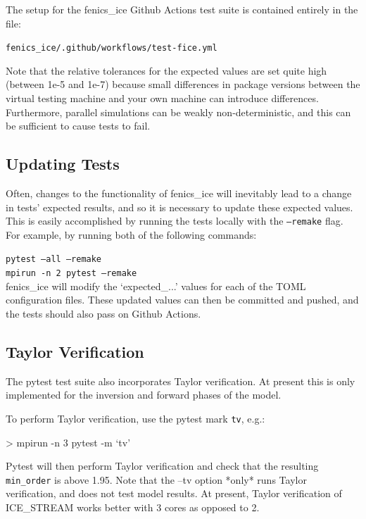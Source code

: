 \documentclass[11pt, reqno, nocenter]{article}
\begin{document}
The setup for the fenics\_ice Github Actions test suite is contained entirely in the file:

\texttt{fenics\_ice/.github/workflows/test-fice.yml}

Note that the relative tolerances for the expected values are set quite high (between 1e-5 and 1e-7) because small differences in package versions between the virtual testing machine and your own machine can introduce differences. Furthermore, parallel simulations can be weakly non-deterministic, and this can be sufficient to cause tests to fail.

\subsection{Updating Tests}

Often, changes to the functionality of fenics\_ice will inevitably lead to a change in tests' expected results, and so it is necessary to update these expected values. This is easily accomplished by running the tests locally with the \texttt{--remake} flag. For example, by running both of the following commands:

\texttt{pytest --all --remake}\\
\texttt{mpirun -n 2 pytest --remake}\\

fenics\_ice will modify the `expected\_...' values for each of the TOML configuration files. These updated values can then be committed and pushed, and the tests should also pass on Github Actions.

\subsection{Taylor Verification}

The pytest test suite also incorporates Taylor verification. At present this is only implemented for the inversion and forward phases of the model.

To perform Taylor verification, use the pytest mark \texttt{tv}, e.g.:
\begin{spverbatim}
> mpirun -n 3 pytest -m `tv'
\end{spverbatim}

Pytest will then perform Taylor verification and check that the resulting \texttt{min\_order} is above 1.95. Note that the --tv option *only* runs Taylor verification, and does not test model results. At present, Taylor verification of ICE\_STREAM works better with 3 cores as opposed to 2.
\end{document}
